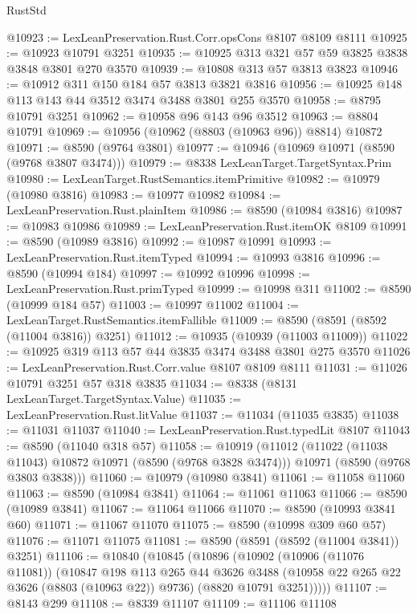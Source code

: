 \begin{lexlean}{RustStd}
\begin{coremodule}
@10923 := LexLeanPreservation.Rust.Corr.opsCons @8107 @8109 @8111
@10925 := @10923 @10791 @3251
@10935 := @10925 @313 @321 @57 @59 @3825 @3838 @3848 @3801 @270 @3570
@10939 := @10808 @313 @57 @3813 @3823
@10946 := @10912 @311 @150 @184 @57 @3813 @3821 @3816
@10956 := @10925 @148 @113 @143 @44 @3512 @3474 @3488 @3801 @255 @3570
@10958 := @8795 @10791 @3251
@10962 := @10958 @96 @143 @96 @3512
@10963 := @8804 @10791
@10969 := @10956 (@10962 (@8803 (@10963 @96)) @8814) @10872
@10971 := @8590 (@9764 @3801)
@10977 := @10946 (@10969 @10971 (@8590 (@9768 @3807 @3474)))
@10979 := @8338 LexLeanTarget.TargetSyntax.Prim
@10980 := LexLeanTarget.RustSemantics.itemPrimitive
@10982 := @10979 (@10980 @3816)
@10983 := @10977 @10982
@10984 := LexLeanPreservation.Rust.plainItem
@10986 := @8590 (@10984 @3816)
@10987 := @10983 @10986
@10989 := LexLeanPreservation.Rust.itemOK @8109
@10991 := @8590 (@10989 @3816)
@10992 := @10987 @10991
@10993 := LexLeanPreservation.Rust.itemTyped
@10994 := @10993 @3816
@10996 := @8590 (@10994 @184)
@10997 := @10992 @10996
@10998 := LexLeanPreservation.Rust.primTyped
@10999 := @10998 @311
@11002 := @8590 (@10999 @184 @57)
@11003 := @10997 @11002
@11004 := LexLeanTarget.RustSemantics.itemFallible
@11009 := @8590 (@8591 (@8592 (@11004 @3816)) @3251)
@11012 := @10935 (@10939 (@11003 @11009))
@11022 := @10925 @319 @113 @57 @44 @3835 @3474 @3488 @3801 @275 @3570
@11026 := LexLeanPreservation.Rust.Corr.value @8107 @8109 @8111
@11031 := @11026 @10791 @3251 @57 @318 @3835
@11034 := @8338 (@8131 LexLeanTarget.TargetSyntax.Value)
@11035 := LexLeanPreservation.Rust.litValue
@11037 := @11034 (@11035 @3835)
@11038 := @11031 @11037
@11040 := LexLeanPreservation.Rust.typedLit @8107
@11043 := @8590 (@11040 @318 @57)
@11058 := @10919
    (@11012
      (@11022 (@11038 @11043) @10872 @10971 (@8590 (@9768 @3828 @3474)))
      @10971
      (@8590 (@9768 @3803 @3838)))
@11060 := @10979 (@10980 @3841)
@11061 := @11058 @11060
@11063 := @8590 (@10984 @3841)
@11064 := @11061 @11063
@11066 := @8590 (@10989 @3841)
@11067 := @11064 @11066
@11070 := @8590 (@10993 @3841 @60)
@11071 := @11067 @11070
@11075 := @8590 (@10998 @309 @60 @57)
@11076 := @11071 @11075
@11081 := @8590 (@8591 (@8592 (@11004 @3841)) @3251)
@11106 := @10840
    (@10845
      (@10896
        (@10902
          (@10906 (@11076 @11081))
          (@10847
            @198
            @113
            @265
            @44
            @3626
            @3488
            (@10958 @22 @265 @22 @3626 (@8803 (@10963 @22)) @9736)
            (@8820 @10791 @3251)))))
@11107 := @8143 @299
@11108 := @8339 @11107
@11109 := @11106 @11108

\end{coremodule}
\end{lexlean}
